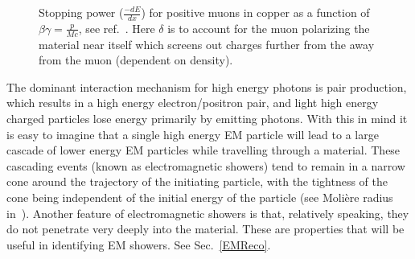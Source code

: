 \begin{figure}[!ht]
  \begin{center}
  \end{center}
  \caption[Stopping power for positive muons in copper.]
  {\small Stopping power ($\frac{-dE}{dx}$) for positive muons in copper as a function of $\beta\gamma=\frac{p}{Mc}$, see ref.~\cite{PDG}.  Here $\delta$ is to account for the muon polarizing the material near itself which screens out charges further from the away from the muon (dependent on density).  } 
  \label{StoppingMuon}
\end{figure}

The dominant interaction mechanism for high energy photons is pair production, which results in a high energy electron/positron pair, and light high energy charged particles lose energy primarily by emitting photons.  
With this in mind it is easy to imagine that a single high energy EM particle will lead to a large cascade of lower energy EM particles while travelling through a material.  
These cascading events (known as electromagnetic showers) tend to remain in a narrow cone around the trajectory of the initiating particle, with the tightness of the cone being independent of the initial energy of the particle (see Moli{\`e}re radius in~\cite{grupen2008particle}).  
Another feature of electromagnetic showers is that, relatively speaking, they do not penetrate very deeply into the material.   
These are properties that will be useful in identifying EM showers.  
See Sec.~\ref{EMReco}. 

